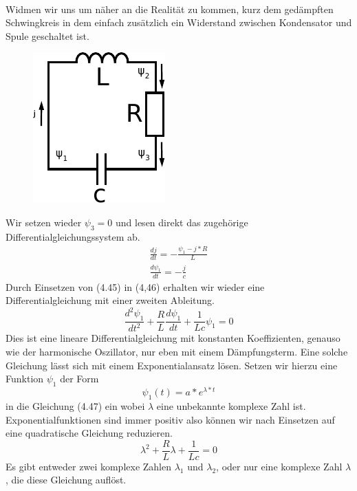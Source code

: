 \documentclass[11pt,a4paper,leqno]{report}
\numberwithin{equation}{chapter}
\begin{document}
\\
Widmen wir uns um n\"aher an die Realit\"at zu kommen, kurz dem ged\"ampften Schwingkreis in dem einfach zus\"atzlich ein Widerstand zwischen Kondensator und Spule geschaltet ist.
  \begin{figure}[H]
	\begin{center}
		\includegraphics[scale=1]{Bilder/schnwingkreis_gedampft.pdf}
	\end{center}
\end{figure}
\noindent
Wir setzen wieder $\psi_3=0$ und lesen direkt das zugeh\"orige Differentialgleichungssystem ab.
\begin{align}
	\frac{dj}{dt} = -\frac{\psi_1 - j*R}{L}\\
	\frac{d\psi_1}{dt} = -\frac{j}{c}
\end{align}
Durch Einsetzen von (4.45) in (4,46) erhalten wir wieder eine Differentialgleichung mit einer zweiten Ableitung.
\begin{equation}
	\frac{d^2\psi_1}{dt^2} + \frac{R}{L}\frac{d\psi_1}{dt} + \frac{1}{Lc}\psi_1 = 0
\end{equation}
Dies ist eine lineare Differentialgleichung mit konstanten Koeffizienten, genauso wie der harmonische Oszillator, nur eben mit einem D\"ampfungsterm. Eine solche Gleichung l\"asst sich mit einem Exponentialansatz l\"osen. Setzen wir hierzu eine Funktion $\psi_1$ der Form
\begin{equation}
\psi_1(t) = a*e^{\lambda*t}
\end{equation}
in die Gleichung (4.47) ein wobei $\lambda$ eine unbekannte komplexe Zahl ist. 
Exponentialfunktionen sind immer positiv also k\"onnen wir nach Einsetzen auf eine quadratische Gleichung reduzieren.
\begin{equation}
\lambda^2 + \frac{R}{L}\lambda + \frac{1}{Lc} = 0
\end{equation}
Es gibt entweder zwei komplexe Zahlen $\lambda_1$ und $\lambda_2$, oder nur eine komplexe Zahl $\lambda$, die diese Gleichung aufl\"ost. 
\end{document}
